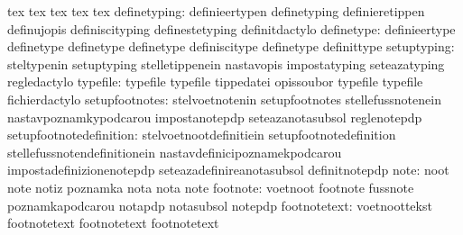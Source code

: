                                   tex                              tex
                                  tex                              tex
                                  tex
                    definetyping: definieertypen                   definetyping
                                  definieretippen                  definujopis
                                  definiscityping                  definestetyping
                                  definitdactylo
                      definetype: definieertype                    definetype
                                  definetype                       definetype
                                  definiscitype                    definetype
                                  definittype
                     setuptyping: steltypenin                      setuptyping
                                  stelletippenein                  nastavopis
                                  impostatyping                    seteazatyping
                                  regledactylo
                        typefile: typefile                         typefile
                                  tippedatei                       opissoubor
                                  typefile                         typefile
                                  fichierdactylo
                  setupfootnotes: stelvoetnotenin                  setupfootnotes
                                  stellefussnotenein               nastavpoznamkypodcarou
                                  impostanotepdp                   seteazanotasubsol
                                  reglenotepdp
         setupfootnotedefinition: stelvoetnootdefinitiein          setupfootnotedefinition
                                  stellefussnotendefinitionein     nastavdefinicipoznamekpodcarou
                                  impostadefinizionenotepdp        seteazadefinireanotasubsol
                                  definitnotepdp
                            note: noot                             note
                                  notiz                            poznamka
                                  nota                             nota
                                  note
                        footnote: voetnoot                         footnote
                                  fussnote                         poznamkapodcarou
                                  notapdp                          notasubsol
                                  notepdp
                    footnotetext: voetnoottekst                    footnotetext
                                  footnotetext                     footnotetext
